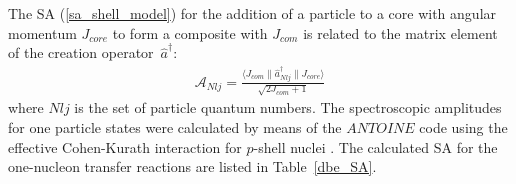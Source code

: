 \documentclass[
12pt, %
oneside, %
english, %
doublespacing, %
doublespacing, %
toctotoc, %
parskip, %
headsepline, %
]{MastersDoctoralThesis} %
\begin{document}
The SA ({\ref{sa_shell_model}}) for the addition of a particle to a core with angular momentum $J_{core}$ to form a composite with $J_{com}$ is related to the matrix element of the creation operator~$\hat{a}^\dagger$:
\begin{eqnarray}\label{eq:SA}
\mathcal{A}_{Nlj} = \frac{\langle J_{com} \| \hat{a}^\dagger _{Nlj} \| J_{core}  \rangle}{\sqrt{2J_{com}+1}}
\end{eqnarray}
where $Nlj$ is the set of particle quantum numbers. The spectroscopic amplitudes for one particle states were calculated by means of the $ANTOINE$ code \cite{antoine}  using the effective Cohen-Kurath interaction for $p$-shell nuclei \cite{cohen1965}. The calculated SA for the one-nucleon transfer reactions are listed in Table~\ref{dbe_SA}.
\end{document}
